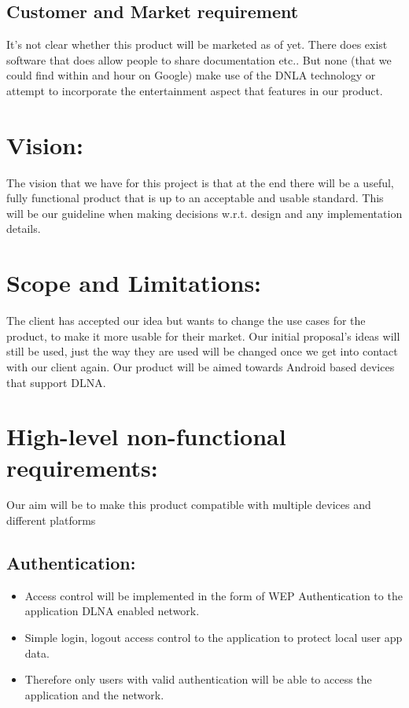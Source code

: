 \documentclass[12pt]{article}
\begin{document}
\subsection{Customer and Market requirement}
It's not clear whether this product will be marketed as of yet.
There does exist software that does allow people to share documentation etc.. But none (that we could find within and hour on Google) make use of the DNLA technology or attempt to incorporate the entertainment aspect that features in our product.

\newpage
\section{Vision:}
The vision that we have for this project is that at the end there will be a useful, fully functional product that is up to an acceptable and usable standard. This will be our guideline when making decisions w.r.t. design and any implementation details.

\section{Scope and Limitations:}
The client has accepted our idea but wants to change the use cases for the product, to make it more usable for their market. Our initial proposal's ideas will still be used, just the way they are used will be changed once we get into contact with our client again. Our product will be aimed towards Android based devices that support DLNA.

\section{High-level non-functional requirements:}
Our aim will be to make this product compatible with multiple devices and different platforms

\subsection{Authentication:}
	\begin{itemize}
	\item Access control will be implemented in the form of WEP Authentication to the application DLNA enabled network.
	\item Simple login, logout access control to the application to protect local user app data.
	\item Therefore only users with valid authentication will be able to access the application and the network.
	\end{itemize}
\end{document}
